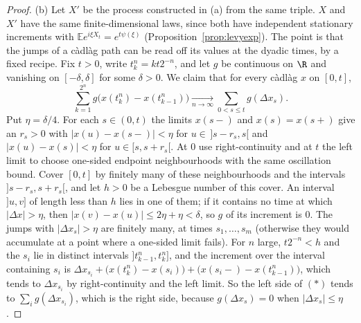 \begin{proof}
(b) Let $X'$ be the process constructed in (a) from the same triple. $X$ and $X'$ have the same finite-dimensional laws, since both have independent stationary increments with $\mathbb Ee^{i\xi X_t}=e^{t\psi(\xi)}$ (Proposition~\ref{prop:levyexp}).
The point is that the jumps of a c\`adl\`ag path can be read off its values at the dyadic times, by a fixed recipe. Fix $t>0$, write $t_k^n=kt2^{-n}$, and let $g$ be continuous on $\R$ and vanishing on $[-\delta,\delta]$ for some $\delta>0$. We claim that for every c\`adl\`ag $x$ on $[0,t]$,
\[
\sum_{k=1}^{2^n}g\bigl(x(t_k^n)-x(t_{k-1}^n)\bigr)\xrightarrow[n\to\infty]{}\sum_{0<s\le t}g(\Delta x_s).\tag{$*$}
\]
Put $\eta=\delta/4$. For each $s\in(0,t)$ the limits $x(s-)$ and $x(s)=x(s+)$ give an $r_s>0$ with $|x(u)-x(s-)|<\eta$ for $u\in\,]s-r_s,s[$ and $|x(u)-x(s)|<\eta$ for $u\in[s,s+r_s[$. At $0$ use right-continuity and at $t$ the left limit to choose one-sided endpoint neighbourhoods with the same oscillation bound. Cover $[0,t]$ by finitely many of these neighbourhoods and the intervals $]s-r_s,s+r_s[$, and let $h>0$ be a Lebesgue number of this cover. An interval $]u,v]$ of length less than $h$ lies in one of them; if it contains no time at which $|\Delta x|>\eta$, then $|x(v)-x(u)|\le2\eta+\eta<\delta$, so $g$ of its increment is $0$. The jumps with $|\Delta x_s|>\eta$ are finitely many, at times $s_1,\dots,s_m$ (otherwise they would accumulate at a point where a one-sided limit fails). For $n$ large, $t2^{-n}<h$ and the $s_i$ lie in distinct intervals $]t_{k-1}^n,t_k^n]$, and the increment over the interval containing $s_i$ is $\Delta x_{s_i}+\bigl(x(t_k^n)-x(s_i)\bigr)+\bigl(x(s_i-)-x(t_{k-1}^n)\bigr)$, which tends to $\Delta x_{s_i}$ by right-continuity and the left limit. So the left side of $(*)$ tends to $\sum_ig(\Delta x_{s_i})$, which is the right side, because $g(\Delta x_s)=0$ when $|\Delta x_s|\le\eta$.


\end{proof}
